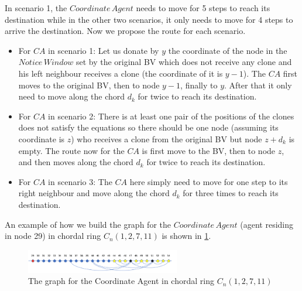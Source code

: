 In scenario 1, the $Coordinate\,Agent$ needs to move for 5 steps to reach its destination while in the other two scenarios, it only needs to move for 4 steps to arrive the destination. Now we propose the route for each scenario.
\begin{itemize}
\item For $CA$ in scenario 1: Let us donate by $y$ the coordinate of the node in the $Notice\,Window$ set by the original BV which does not receive any clone and his left neighbour receives a clone (the coordinate of it is $y-1$). The $CA$ first moves to the original BV, then to node $y-1$, finally to $y$. After that it only need to move along the chord $d_k$ for twice to reach its destination.
\item For $CA$ in scenario 2: There is at least one pair of the positions of the clones does not satisfy the equations so there should be one node (assuming its coordinate is $z$) who receives a clone from the original BV but node $z+d_k$ is empty. The route now for the $CA$ is first move to the BV, then to node $z$, and then moves along the chord $d_k$ for twice to reach its destination.
\item For $CA$ in scenario 3: The $CA$ here simply need to move for one step to its right neighbour and move along the chord $d_k$ for three times to reach its destination.
\end{itemize}


An example of how we build the graph for the $Coordinate\,Agent$ (agent residing in node 29) in chordal ring $C_n(1,2,7,11)$ is shown in \ref{fig:DAGraph}.
 \begin{figure}[H]
  \centering  
  \includegraphics[width=0.6\textwidth]{figures/DAGraph.png}
  \caption{The graph for the Coordinate Agent in chordal ring $C_n(1,2,7,11)$}\label{fig:DAGraph}
\end{figure}

